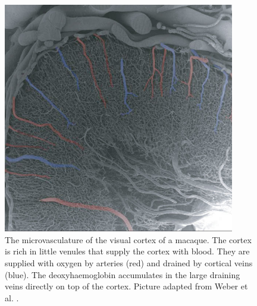 \begin{figure}[!ht]
	\centering
	\includegraphics[width=0.9\textwidth, clip=true]{./Chapters/01_Introduction/Images/Microvasculature}
	\caption{The microvasculature of the visual cortex of a macaque. The cortex is rich in little venules that supply the cortex with blood. They are supplied with oxygen by arteries (red) and drained by cortical veins (blue). The deoxyhaemoglobin accumulates in the large draining veins directly on top of the cortex. Picture adapted from Weber et al. \cite{Weber2008}.}
	\label{fig:microvasulature}
\end{figure}